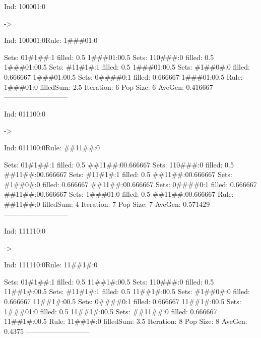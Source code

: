 \documentclass[12pt,openright,twoside,letterpaper,english,brazil,sumario=tradicional]{abntex2}
\begin{document}
\begin{flushleft}\ttfamily
\par Ind: 100001:0\end{flushleft} -> \begin{flushleft}\ttfamily
\par Ind: 100001:0Rule: 1\#\#\#01:0
\end{flushleft}  Sets:	01\#1\#\#:1 filled: 0.5 1\#\#\#01:0{0.5}
  Sets:	110\#\#\#:0 filled: 0.5 1\#\#\#01:0{0.5}
  Sets:	\#11\#1\#:1 filled: 0.5 1\#\#\#01:0{0.5}
  Sets:	\#1\#\#0\#:0 filled: 0.666667 1\#\#\#01:0{0.5}
  Sets:	0\#\#\#\#0:1 filled: 0.666667 1\#\#\#01:0{0.5}
Rule:	1\#\#\#01:0
filledSum: 2.5
Iteration: 6 Pop Size: 6 AveGen: 0.416667
---------------------------

\begin{flushleft}\ttfamily
\par Ind: 011100:0\end{flushleft} -> \begin{flushleft}\ttfamily
\par Ind: 011100:0Rule: \#\#11\#\#:0
\end{flushleft}  Sets:	01\#1\#\#:1 filled: 0.5 \#\#11\#\#:0{0.666667}
  Sets:	110\#\#\#:0 filled: 0.5 \#\#11\#\#:0{0.666667}
  Sets:	\#11\#1\#:1 filled: 0.5 \#\#11\#\#:0{0.666667}
  Sets:	\#1\#\#0\#:0 filled: 0.666667 \#\#11\#\#:0{0.666667}
  Sets:	0\#\#\#\#0:1 filled: 0.666667 \#\#11\#\#:0{0.666667}
  Sets:	1\#\#\#01:0 filled: 0.5 \#\#11\#\#:0{0.666667}
Rule:	\#\#11\#\#:0
filledSum: 4
Iteration: 7 Pop Size: 7 AveGen: 0.571429
---------------------------

\begin{flushleft}\ttfamily
\par Ind: 111110:0\end{flushleft} -> \begin{flushleft}\ttfamily
\par Ind: 111110:0Rule: 11\#\#1\#:0
\end{flushleft}  Sets:	01\#1\#\#:1 filled: 0.5 11\#\#1\#:0{0.5}
  Sets:	110\#\#\#:0 filled: 0.5 11\#\#1\#:0{0.5}
  Sets:	\#11\#1\#:1 filled: 0.5 11\#\#1\#:0{0.5}
  Sets:	\#1\#\#0\#:0 filled: 0.666667 11\#\#1\#:0{0.5}
  Sets:	0\#\#\#\#0:1 filled: 0.666667 11\#\#1\#:0{0.5}
  Sets:	1\#\#\#01:0 filled: 0.5 11\#\#1\#:0{0.5}
  Sets:	\#\#11\#\#:0 filled: 0.666667 11\#\#1\#:0{0.5}
Rule:	11\#\#1\#:0
filledSum: 3.5
Iteration: 8 Pop Size: 8 AveGen: 0.4375
---------------------------
\end{document}
